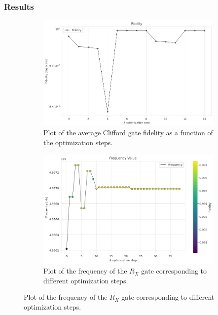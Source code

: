 \subsubsection{Results}
\begin{figure}[htbp]
    \centering
    \begin{subfigure}[t]{0.45\textwidth}
        \includegraphics[width=\textwidth]{figures/png/RB_optimization/SLSQP/fidelity.png}
        \caption{Plot of the average Clifford gate fidelity as a function of the optimization steps.}
        \label{NM_true_fig:fidelity}
    \end{subfigure}
    \hfill
    \begin{subfigure}[t]{0.45\textwidth}
        \includegraphics[width=\textwidth]{figures/png/RB_optimization/NM/post_ft_true/frequency.png}
        \caption{Plot of the frequency of the $R_X$ gate corresponding to different optimization steps.}
        \label{NM_true_fig:frequency}
    \end{subfigure}


\end{figure}
